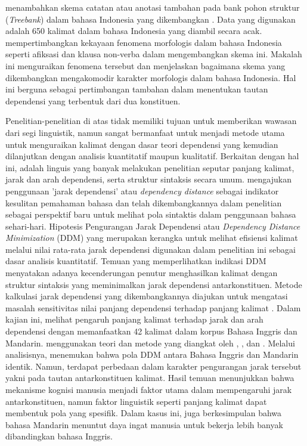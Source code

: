 \cite{irmawati2015dependency} menambahkan skema catatan atau anotasi tambahan pada bank pohon struktur (\textit{Treebank}) dalam bahasa Indonesia yang dikembangkan \cite{green2012indonesian}. Data yang digunakan adalah 650 kalimat dalam bahasa Indonesia yang diambil secara acak. \cite{irmawati2015dependency} mempertimbangkan kekayaan fenomena morfologis dalam bahasa Indonesia seperti afiksasi dan klausa non-verba dalam mengembangkan skema ini. Makalah ini menguraikan fenomena tersebut dan menjelaskan bagaimana skema yang dikembangkan mengakomodir karakter morfologis dalam bahasa Indonesia. Hal ini berguna sebagai pertimbangan tambahan dalam menentukan tautan dependensi yang terbentuk dari dua konstituen. 

Penelitian-penelitian di atas tidak memiliki tujuan untuk memberikan wawasan dari segi linguistik, namun sangat bermanfaat untuk menjadi metode utama untuk menguraikan kalimat dengan dasar teori dependensi yang kemudian dilanjutkan dengan analisis kuantitatif maupun kualitatif. Berkaitan dengan hal ini, \cite{liu2008dependency} adalah linguis yang banyak melakukan penelitian seputar panjang kalimat, jarak dan arah dependensi, serta struktur sintaksis secara umum. \cite{liu2008dependency} mengajukan penggunaan 'jarak dependensi' atau \textit{dependency distance} sebagai indikator kesulitan pemahaman bahasa dan telah dikembangkannya dalam penelitian \cite{liu2017dependency} sebagai perspektif baru untuk melihat pola sintaktis dalam penggunaan bahasa sehari-hari. Hipotesis Pengurangan Jarak Dependensi atau \textit{Dependency Distance Minimization} (DDM) yang merupakan kerangka untuk melihat efisiensi kalimat melalui nilai rata-rata jarak dependensi digunakan dalam penelitian ini sebagai dasar analisis kuantitatif. Temuan yang memperlihatkan indikasi DDM menyatakan adanya kecenderungan penutur menghasilkan kalimat dengan struktur sintaksis yang meminimalkan jarak dependensi antarkonstituen. Metode kalkulasi jarak dependensi yang dikembangkannya diajukan untuk mengatasi masalah sensitivitas nilai panjang dependensi terhadap panjang kalimat \citep{jiang2015effects}. Dalam kajian ini, \cite{jiang2015effects} melihat pengaruh panjang kalimat terhadap jarak dan arah dependensi dengan memanfaatkan 42 kalimat dalam korpus Bahasa Inggris dan Mandarin. \cite{jiang2015effects} menggunakan teori dan metode yang diangkat oleh \cite{tesniere1959elements}, \cite{hudson2007language}, dan \cite{nivre2006maltparser}. Melalui analisisnya,  \cite{jiang2015effects} menemukan bahwa pola DDM antara Bahasa Inggris dan Mandarin identik. Namun, terdapat perbedaan dalam karakter pengurangan jarak tersebut yakni pada tautan antarkonstituen kalimat. Hasil temuan menunjukkan bahwa mekanisme kognisi manusia menjadi faktor utama dalam mempengaruhi jarak antarkonstituen, namun faktor linguistik seperti panjang kalimat dapat membentuk pola yang spesifik. Dalam kasus ini, \cite{jiang2015effects} juga berkesimpulan bahwa bahasa Mandarin menuntut daya ingat manusia untuk bekerja lebih banyak dibandingkan bahasa Inggris. 

